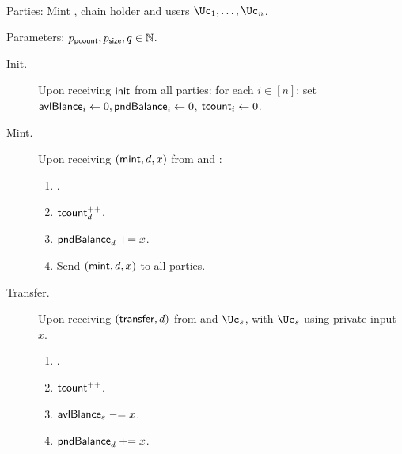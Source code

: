 \begin{functionality}\label{func:ConfidentialTransactions}~
	
	
	
	\item[Parties:]	Mint \Mc, chain holder  \Cc and users  $\Uc_1, 
	\ldots,\Uc_n$.
	
	
	\item[Parameters:] $p_{\mathsf{pcount}},p_{\mathsf{size}},q \in {\mathbb{N}}$.
	
	
	\begin{description}
		\item[Init.] Upon receiving $\mathsf{init}$ from  all parties: for each $i\in [n]$:  set $\mathsf{avlBlance}_i\leftarrow 0,\mathsf{pndBalance}_i \leftarrow 0$, $\mathsf{tcount}_i \leftarrow 0$.
		
			\item[Mint.]   Upon receiving $(\mathsf{mint},d,x)$ from  \Cc and \Mc:
		\begin{enumerate}
			
			
			\item {}.
			
			\item $\mathsf{tcount}_d^{++}$.
			
			\item $\mathsf{pndBalance}_d \mathrel{+}= x$.
			
			\item Send $(\mathsf{mint},d,x)$ to all parties.
		\end{enumerate}
		
		
		\item[Transfer.]    Upon receiving  $(\mathsf{transfer},d)$ from  \Cc and  $\Uc_s$, with  $\Uc_s$ using private input $x$. 
		
	
		\begin{enumerate}
			\item {}.
			
				\item $\mathsf{tcount}^{++}$.
				
				
			\item $\mathsf{avlBlance}_s \mathrel{-}= x$.
			
			\item   $\mathsf{pndBalance}_d \mathrel{+}= x$.
			
			
			
		

\end{enumerate}
\end{description}
\end{functionality}
